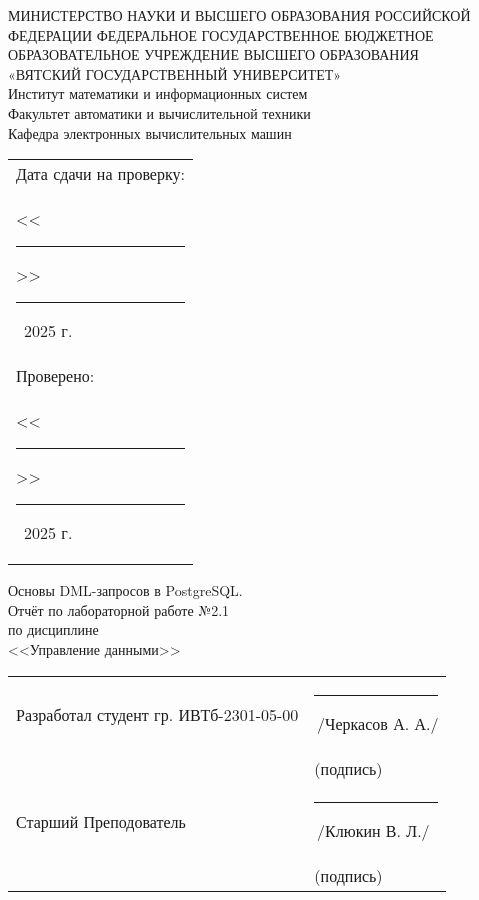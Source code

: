 \documentclass[oneside,a4paper,14pt]{extarticle}
\begin{document}
\newpage
\thispagestyle{empty}
\begin{center}
  МИНИСТЕРСТВО НАУКИ И ВЫСШЕГО ОБРАЗОВАНИЯ РОССИЙСКОЙ ФЕДЕРАЦИИ ФЕДЕРАЛЬНОЕ ГОСУДАРСТВЕННОЕ БЮДЖЕТНОЕ ОБРАЗОВАТЕЛЬНОЕ УЧРЕЖДЕНИЕ ВЫСШЕГО ОБРАЗОВАНИЯ\\
  «ВЯТСКИЙ ГОСУДАРСТВЕННЫЙ УНИВЕРСИТЕТ»\\
  Институт математики и информационных систем\\
  Факультет автоматики и вычислительной техники\\
  Кафедра электронных вычислительных машин
\end{center}
\vspace{10mm}

\hfill
\begin{tabular}{l}
  \footnotesize Дата сдачи на проверку:                                          \\
  \footnotesize <<\rule[-1mm]{5mm}{0.10mm}\/>>\rule[-1mm]{20mm}{0.10mm}\ 2025 г. \\
  \footnotesize Проверено:                                                       \\
  \footnotesize <<\rule[-1mm]{5mm}{0.10mm}\/>>\rule[-1mm]{20mm}{0.10mm}\ 2025 г. \\
\end{tabular}
\vfill

\begin{center}
  Основы DML-запросов в PostgreSQL.\\
  Отчёт по лабораторной работе №2.1\\
  по дисциплине\\
  <<Управление данными>>\\
\end{center}
\vspace{25mm}
\noindent
\begin{tabular}{ll}
  Разработал студент гр. ИВТб-2301-05-00 & \hspace{18mm}\rule[-1mm]{30mm}{0.10mm}\,/Черкасов А. А./ \\
                                         & \hspace{25.5mm}\footnotesize(подпись)                    \\
  Старший Преподователь                  & \hspace{18mm}\rule[-1mm]{30mm}{0.10mm}\,/Клюкин В. Л./   \\
                                         & \hspace{25.5mm}\footnotesize(подпись)                    \\
\end{tabular}
\end{document}
